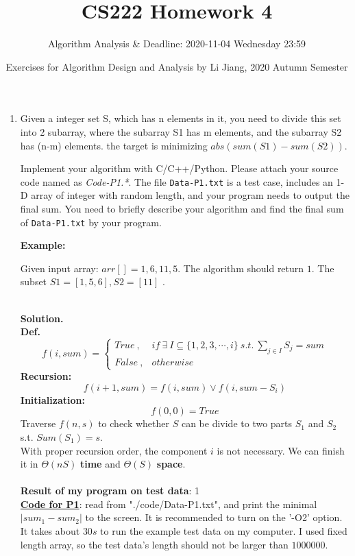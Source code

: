 \documentclass{article}
\title{CS222 Homework 4}
\author{Algorithm Analysis \& Deadline: 2020-11-04 Wednesday 23:59}
\date{Exercises for Algorithm Design and Analysis by Li Jiang, 2020 Autumn Semester}
\newtheorem*{solution}{Solution}
\renewenvironment{solution}[1][Solution]{~\\ \textbf{#1.}}{~\\}
\newcommand{\myblock}[2]{\textbf{#1}\ {#2}}
\begin{document}
\maketitle

\begin{enumerate}
\item
Given a integer set S, which has n elements in it, you need to divide this set into 2 subarray, where the subarray S1 has m elements, and the subarray S2 has (n-m) elements. the target is minimizing $abs(sum(S1) -sum(S2))$.

Implement your algorithm with C/C++/Python. Please attach your source code named as {\color{red}\emph{Code-P1.*}}. The file \texttt{Data-P1.txt} is a test case, includes an 1-D array of integer with random length, and your program needs to output the final sum. You need to briefly describe your algorithm and find the final sum of \texttt{Data-P1.txt} by your program.

\textbf{Example:}

Given input array: $arr[]={1, 6, 11, 5}$. The algorithm should return $1$. The subset $S1=[1, 5, 6], S2=[11]$ .

\begin{solution}
~\\
\myblock{Def.}{}
$$f(i,sum)=\left\{\begin{array}{ll}True\ ,& if\ \exists\ I\subseteq \{1,2,3,\cdots,i\}\ s.t.\ \sum_{j\in I} S_j = sum\\False\ ,& otherwise \end{array}\right.$$
\myblock{Recursion:}{} 
$$f(i+1,sum) = f(i,sum) \vee f(i, sum-S_i)$$
\myblock{Initialization:}{}
$$f(0, 0) = True$$
Traverse $f(n, s)$ to check whether $S$ can be divide to two parts $S_1$ and $S_2$ s.t. $Sum(S_1)=s$.\\
With proper recursion order, the component $i$ is not necessary. We can finish it in $\Theta(nS)$ \textbf{time} and $\Theta(S)$ \textbf{space}.\\
~\\
\textbf{Result of my program on test data}: 1\\
\href{run:./code/main1.cpp}{\textbf{Code for P1}}: read from "./code/Data-P1.txt", and print the minimal $|sum_1-sum_2|$ to the screen. It is recommended to turn on the '-O2' option. It takes about $30s$ to run the example test data on my computer. I used fixed length array, so the test data's length should not be larger than $1000000$.
\end{solution}


\end{enumerate}
\end{document}
